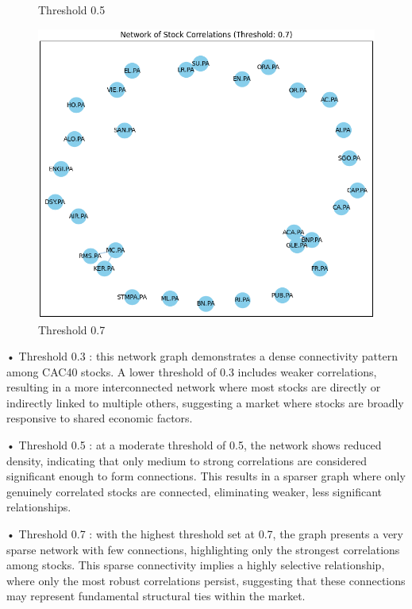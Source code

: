 \documentclass[12pt]{article}
\begin{document}
\begin{figure}[h!]
\begin{minipage}[b]{0.32\textwidth}
      \caption{Threshold 0.5}
      \label{fig:threshold05}
  \end{minipage}
  \hfill
  \begin{minipage}[b]{0.32\textwidth}
      \includegraphics[width=\textwidth]{2D_network_stock_corr7.png}
      \caption{Threshold 0.7}
      \label{fig:threshold07}
  \end{minipage}
  \label{fig:stock_networks}
\end{figure}

•	Threshold 0.3 : this network graph demonstrates a dense connectivity pattern among CAC40 stocks. A lower threshold of 0.3 includes weaker correlations, resulting in a more interconnected network where most stocks are directly or indirectly linked to multiple others, suggesting a market where stocks are broadly responsive to shared economic factors.

•	Threshold 0.5 : at a moderate threshold of 0.5, the network shows reduced density, indicating that only medium to strong correlations are considered significant enough to form connections. This results in a sparser graph where only genuinely correlated stocks are connected, eliminating weaker, less significant relationships. 

•	Threshold 0.7 : with the highest threshold set at 0.7, the graph presents a very sparse network with few connections, highlighting only the strongest correlations among stocks. This sparse connectivity implies a highly selective relationship, where only the most robust correlations persist, suggesting that these connections may represent fundamental structural ties within the market.
\end{document}
